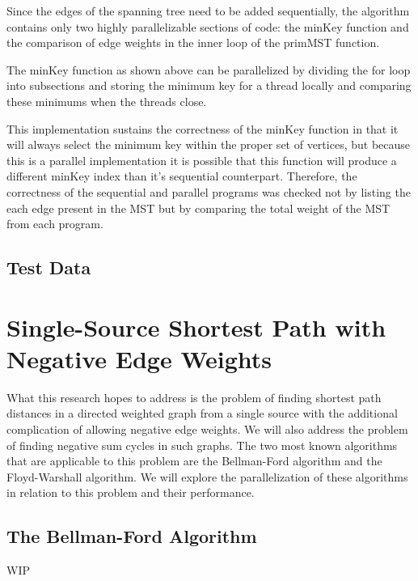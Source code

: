 \documentclass[conference]{IEEEtran}
\begin{document}


Since the edges of the spanning tree need to be added sequentially, the algorithm contains only two highly parallelizable sections of code: the minKey function and the comparison of edge weights in the inner loop of the primMST function.
\newpage


The minKey function as shown above can be parallelized by dividing the for loop into subsections and storing the minimum key for a thread locally and comparing these minimums when the threads close.



This implementation sustains the correctness of the minKey function in that it will always select the minimum key within the proper set of vertices, but because this is a parallel implementation it is possible that this function will produce a different minKey index than it's sequential counterpart. Therefore, the correctness of the sequential and parallel programs was checked not by listing the each edge present in the MST but by comparing the total weight of the MST from each program.

\subsection{Test Data}


\section{Single-Source Shortest Path with Negative Edge Weights}
What this research hopes to address is the problem of finding shortest path distances in a directed weighted graph from a single source with the additional complication of allowing negative edge weights. We will also address the problem of finding negative sum cycles in such graphs. The two most known algorithms that are applicable to this problem are the Bellman-Ford algorithm and the Floyd-Warshall algorithm. We will explore the parallelization of these algorithms in relation to this problem and their performance.

\subsection{The Bellman-Ford Algorithm}\label{AA}
WIP
\end{document}
